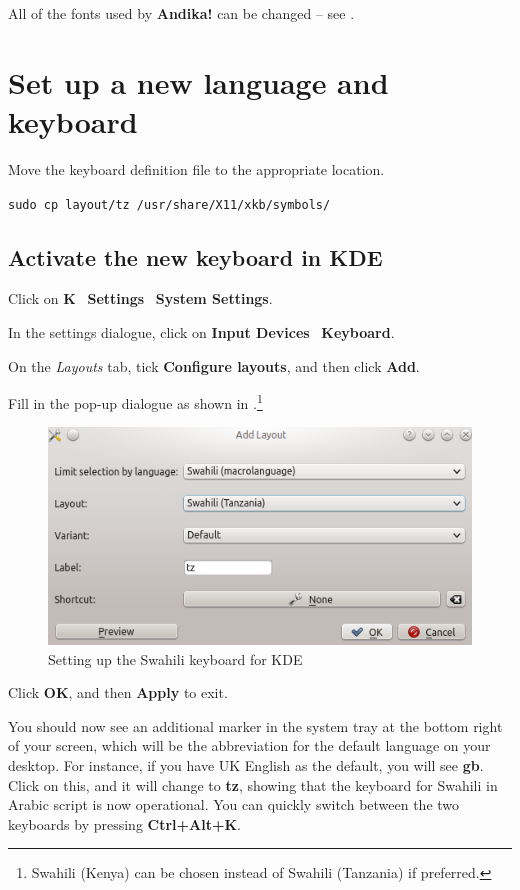All of the fonts used by \textbf{Andika!} can be changed -- see .

\section{Set up a new language and keyboard}
\label{s:keyboard}

Move the keyboard definition file to the appropriate location.

\verb|sudo cp layout/tz /usr/share/X11/xkb/symbols/|

\subsection{Activate the new keyboard in KDE}
\label{s:kbactivate}

Click on \textbf{K} \textrightarrow\ \textbf{Settings} \textrightarrow\ \textbf{System Settings}.

In the settings dialogue, click on \textbf{Input Devices} \textrightarrow\ \textbf{Keyboard}.

On the \textit{Layouts} tab, tick \textbf{Configure layouts}, and then click \textbf{Add}.

Fill in the pop-up dialogue as shown in .\footnote{Swahili (Kenya) can be chosen instead of Swahili (Tanzania) if preferred.}

\begin{figure}[h]
\centering
\includegraphics[keepaspectratio=true]{./images/kdelg.png}
\caption{Setting up the Swahili keyboard for KDE}
\label{fig:kdelg}
\end{figure}

Click \textbf{OK}, and then \textbf{Apply} to exit.

You should now see an additional marker in the system tray at the bottom right of your screen, which will be the abbreviation for the default language on your desktop.  For instance, if you have UK English as the default, you will see \textbf{gb}.  Click on this, and it will change to \textbf{tz}, showing that the keyboard for Swahili in Arabic script is now operational.  You can quickly switch between the two keyboards by pressing \textbf{Ctrl+Alt+K}.

